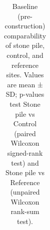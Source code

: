 \documentclass[
  letterpaper,
  DIV=11,
  numbers=noendperiod]{scrartcl}
\begin{document}
{

\begin{longtable}[]{@{}
  >{\raggedright\arraybackslash}p{}
  >{\raggedright\arraybackslash}p{}
  >{\raggedright\arraybackslash}p{}
  >{\raggedright\arraybackslash}p{}
  >{\raggedleft\arraybackslash}p{}
  >{\raggedleft\arraybackslash}p{}@{}}

\caption{\label{tbl-baseline-combined}Baseline (pre-construction)
comparability of stone pile, control, and reference sites. Values are
mean ± SD; p-values test Stone pile vs Control (paired Wilcoxon
signed-rank test) and Stone pile vs Reference (unpaired Wilcoxon
rank-sum test).}

\tabularnewline


\end{longtable}}
\end{document}
